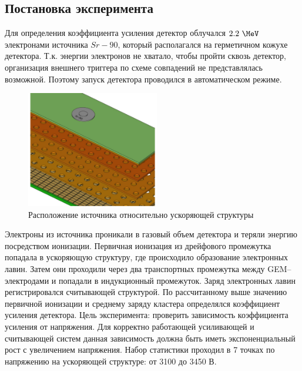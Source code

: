 \subsection{Постановка эксперимента}
Для определения коэффициента усиления детектор облучался $2.2~\MeV$ электронами источника $Sr-90$, который располагался на герметичном кожухе детектора. Т.к. энергии электронов не хватало, чтобы пройти сквозь детектор, организация внешнего триггера по схеме совпадений не представлялась возможной. Поэтому запуск детектора проводился в автоматическом режиме.
\begin{figure}[H]
	\centering
	\includegraphics[height = 4 cm, width= 5.8cm]{img/GEM_Sr_source.pdf}
	\caption{Расположение источника относительно ускоряющей структуры}
	\label{fig:det_scheme+sr90}
\end{figure}
Электроны из источника проникали в газовый объем детектора и теряли энергию посредством ионизации. 
Первичная ионизация из дрейфового промежутка попадала в ускоряющую структуру, где происходило образование электронных лавин. Затем они проходили через два транспортных промежутка между GEM--электродами и попадали в индукционный промежуток. Заряд электронных лавин регистрировался считывающей структурой. По рассчитанному выше значению первичной ионизации и среднему заряду кластера определялся коэффициент усиления детектора. Цель эксперимента: проверить зависимость коэффициента усиления от напряжения. Для корректно работающей усиливающей и считывающей систем данная зависимость должна быть иметь экспоненциальный рост с увеличением напряжения. Набор статистики проходил в 7 точках по напряжению на ускоряющей структуре: от 3100 до 3450 В.

